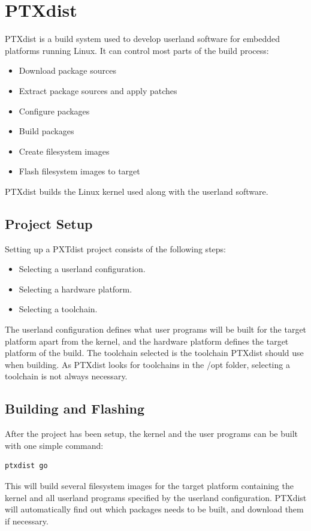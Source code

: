 \section{PTXdist}\label{sec:ptxdist}
PTXdist is a build system used to develop userland software for embedded platforms running Linux. It can control most parts of the build process:
\begin{itemize}
  \item Download package sources
  \item Extract package sources and apply patches
  \item Configure packages
  \item Build packages
  \item Create filesystem images
  \item Flash filesystem images to target
\end{itemize}
PTXdist builds the Linux kernel used along with the userland software.

\subsection{Project Setup}
Setting up a PXTdist project consists of the following steps:
\begin{itemize}
  \item Selecting a userland configuration.
  \item Selecting a hardware platform.
  \item Selecting a toolchain.
\end{itemize}
The userland configuration defines what user programs will be built for the target platform apart from the kernel, and the hardware platform defines the target platform of the build. The toolchain selected is the toolchain PTXdist should use when building. As PTXdist looks for toolchains in the /opt folder, selecting a toolchain is not always necessary.

\subsection{Building and Flashing}
After the project has been setup, the kernel and the user programs can be built with one simple command:
\lstset{style=lststyle-terminal}
\begin{lstlisting}
ptxdist go
\end{lstlisting}
This will build several filesystem images for the target platform containing the kernel and all userland programs specified by the userland configuration. PTXdist will automatically find out which packages needs to be built, and download them if necessary.

